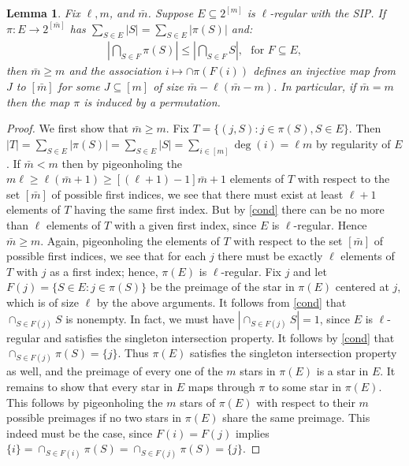 \documentclass[9pt,twocolumn]{pnas-new}
\newtheorem{lemma}{Lemma}
\begin{document}
\begin{lemma}\label{NonEmptyLemma} 
Fix $\ell, m$, and $\bar m$. Suppose $E \subseteq 2^{[m]}$ is $\ell$-regular with the SIP.  If $\pi: E \to 2^{[\bar m]}$ has $\sum_{S \in E} |S| = \sum_{S \in E} |\pi(S)|$ and:
\begin{align}\label{cond}
|\bigcap_{S \in F} \pi(S)| \leq |\bigcap_{S \in F} S |,\ \ \   \text{for } F \subseteq E,
\end{align}
%
then $\bar m \geq m$ and the association $i \mapsto \cap \pi(F(i))$ defines an injective map from $J$ to $[\bar m]$ for some $J \subseteq [m]$ of size $\bar m - \ell(\bar m - m)$. In particular, if $\bar m = m$ then the map $\pi$ is induced by a permutation.
\end{lemma}
\begin{proof}
We first show that $\bar m \geq m$. Fix $T = \{(j, S): j \in \pi(S), S \in E\}$. Then $|T| = \sum_{S \in E} |\pi(S)| = \sum_{S \in E} |S| = \sum_{i \in [m]} \deg(i) = \ell m$ by regularity of $E$. If $\bar m < m$ then by pigeonholing the $m \ell \geq \ell (\bar m + 1) \geq [(\ell + 1) - 1] \bar m + 1$ elements of $T$ with respect to the set $[\bar m]$ of possible first indices, we see that there must exist at least $\ell + 1$ elements of $T$ having the same first index. But by \eqref{cond} there can be no more than $\ell$ elements of $T$ with a given first index, since $E$ is $\ell$-regular. Hence $\bar m \geq m$. 
Again, pigeonholing the elements of $T$ with respect to the set $[\bar m]$ of possible first indices, we see that for each $j$ there must be exactly $\ell$ elements of $T$ with $j$ as a first index; hence, $\pi(E)$ is $\ell$-regular. 
Fix $j$ and let $F(j) = \{S \in E: j \in \pi(S)\}$ be the preimage of the star in $\pi(E)$ centered at $j$, which is of size $\ell$ by the above arguments. It follows from \eqref{cond} that $\cap_{S \in F(j)} S$ is nonempty. In fact, we must have $|\cap _{S \in F(j)} S| = 1$, since $E$ is $\ell$-regular and satisfies the singleton intersection property. It follows by \eqref{cond} that $\cap_{S \in F(j)} \pi(S) = \{j\}$. Thus $\pi(E)$ satisfies the singleton intersection property as well, and the preimage of every one of the $m$ stars in $\pi(E)$ is a star in $E$. It remains to show that every star in $E$ maps through $\pi$ to some star in $\pi(E)$. This follows by pigeonholing the $m$ stars of $\pi(E)$ with respect to their $m$ possible preimages if no two stars in $\pi(E)$ share the same preimage. This indeed must be the case, since $F(i) = F(j)$ implies $\{i\} = \cap_{S \in F(i)} \pi(S) = \cap_{S \in F(j)} \pi(S) = \{j\}$.
\end{proof}
\end{document}
